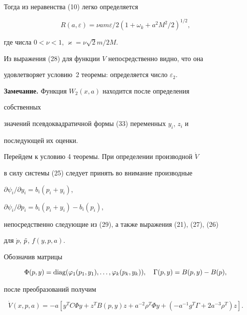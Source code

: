 Тогда из неравенства (10) легко определяется 


$$ 


R(a,\varepsilon)=\nu a m \varepsilon/2(1+\omega_k+a^2M^2/2)^{1/2}, 


$$  


где числа $0<\nu<1$, $\varkappa=\nu\sqrt{2}m/2M$. 


 


Из выражения (28) для функции $V$ непосредственно видно, что она  


удовлетворяет условию~2 теоремы: определяется число $\varepsilon_2$. 


\medskip 


 


{\bf Замечание.} Функция $W_2(x,a)$ находится после определения 


собственных  


значений псевдоквадратичной формы (33) переменных $y_i$, $z_i$ и 


последующей их  оценки. 


\medskip 


 


Перейдем к условию 4 теоремы. При определении производной $\Dot V$ 


в силу системы (25) следует принять во внимание производные 


$\partial\psi_i/\partial y_i=b_i(p_i+y_i)$, 


$\partial\psi_i/\partial p_i=b_i(p_i+y_i)-b_i(p_i)$, 


непосредственно следующие из (29), а также выражения (21), (27), (26)


для $\Dot p$, $\Ddot p$, $f(y,p,a)$. 


Обозначив матрицы 


\begin{equation} 


\Phi(p,y)=\diag(\varphi_1(p_1,y_1),\dotsc,\varphi_k(p_k,y_k)),\quad 


\Gamma(p,y)=B(p,y)-B(p), 


\end{equation} 


после преобразований получим


\begin{equation} 


\Dot V(x,p,a)=-a[y^T C\Phi y+z^T B(p,y)z+a^{-2}\rho^T\Phi y+ 


(-a^{-1}g^T\Gamma+2a^{-3}\rho^T)z]. 


\end{equation} 


